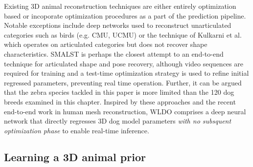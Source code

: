 Existing 3D animal reconstruction techniques are either entirely optimization based or incoporate optimization procedures as a part of the prediction pipeline. Notable exceptions include deep networks used to reconstruct unarticulated categories such as birds (e.g. CMU, UCMU) or the technique of Kulkarni et al.~ which operates on articulated categories but does not recover shape characteristics. SMALST is perhaps the closest attempt to an end-to-end technique for articulated shape and pose recovery, although video sequences are required for training and a test-time optimization strategy is used to refine initial regressed parameters, preventing real time operation. Further, it can be argued that the zebra species tackled in this paper is more limited than the 120 dog breeds examined in this chapter. Inspired by these approaches and the recent end-to-end work in human mesh reconstruction, WLDO comprises a deep neural network that directly regresses 3D dog model parameters \emph{with no subsquent optimization phase} to enable real-time inference.



\subsection{Learning a 3D animal prior}

 
